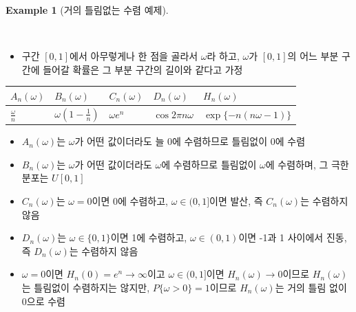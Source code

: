 \documentclass[
  letterpaper,
  DIV=11,
  numbers=noendperiod]{scrreprt}
\providecommand{\tightlist}{%
  \setlength{\itemsep}{0pt}\setlength{\parskip}{0pt}}
\theoremstyle{definition}
\theoremstyle{plain}
\theoremstyle{plain}
\theoremstyle{definition}
\newtheorem{example}{Example}[chapter]
\theoremstyle{plain}
\theoremstyle{definition}
\theoremstyle{remark}
\begin{document}
\begin{example}[거의 틀림없는 수렴
예제]\protect\hypertarget{exm-asconv01}{}\label{exm-asconv01}

~

\begin{itemize}
\tightlist
\item
  구간 \([0,1]\)에서 아무렇게나 한 점을 골라서 \(\omega\)라 하고,
  \(\omega\)가 \([0,1]\)의 어느 부분 구간에 들어갈 확률은 그 부분 구간의
  길이와 같다고 가정
\end{itemize}

\begin{longtable}[]{@{}
  >{\centering\arraybackslash}p{}
  >{\centering\arraybackslash}p{}
  >{\centering\arraybackslash}p{}
  >{\centering\arraybackslash}p{}
  >{\centering\arraybackslash}p{}@{}}
\toprule\noalign{}
\begin{minipage}[b]{\linewidth}\centering
\(A_n(\omega)\)
\end{minipage} & \begin{minipage}[b]{\linewidth}\centering
\(B_n(\omega)\)
\end{minipage} & \begin{minipage}[b]{\linewidth}\centering
\(C_n(\omega)\)
\end{minipage} & \begin{minipage}[b]{\linewidth}\centering
\(D_n(\omega)\)
\end{minipage} & \begin{minipage}[b]{\linewidth}\centering
\(H_n(\omega)\)
\end{minipage} \\
\midrule\noalign{}
\endhead
\bottomrule\noalign{}
\endlastfoot
\(\frac{\omega}{n}\) & \(\omega (1-\frac{1}{n})\) & \(\omega e^n\) &
\(\cos 2\pi n \omega\) & \(\exp \{ -n (n\omega -1) \}\) \\
\end{longtable}

\begin{itemize}
\item
  \(A_n(\omega)\)는 \(\omega\)가 어떤 값이더라도 늘 0에 수렴하므로
  틀림없이 0에 수렴
\item
  \(B_n(\omega)\)는 \(\omega\)가 어떤 값이더라도 \(\omega\)에 수렴하므로
  틀림없이 \(\omega\)에 수렴하며, 그 극한 분포는 \(U[0,1]\)
\item
  \(C_n (\omega)\)는 \(\omega =0\)이면 0에 수렴하고,
  \(\omega \in (0,1]\)이면 발산, 즉 \(C_n (\omega)\)는 수렴하지 않음
\item
  \(D_n (\omega)\)는 \(\omega \in \{0,1\}\)이면 1에 수렴하고,
  \(\omega \in (0,1)\)이면 -1과 1 사이에서 진동, 즉 \(D_n (\omega)\)는
  수렴하지 않음
\item
  \(\omega=0\)이면 \(H_n (0) = e^n \rightarrow \infty\)이고
  \(\omega \in (0,1]\)이면 \(H_n  (\omega) \rightarrow 0\)이므로
  \(H_n (\omega)\)는 틀림없이 수렴하지는 않지만,
  \(P\{\omega >0\}=1\)이므로 \(H_n (\omega)\)는 거의 틀림 없이 0으로
  수렴
\end{itemize}


\end{example}
\end{document}
